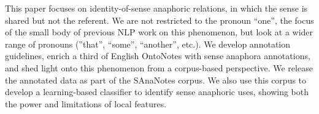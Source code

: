 This paper focuses on identity-of-sense anaphoric relations, in which the sense is shared but not the referent. We are not restricted to the pronoun ``one'', the focus of the small body of previous NLP work on this phenomenon, but look at a wider range of pronouns (''that'', ``some'', ``another'', etc.). We develop annotation guidelines, enrich a third of English OntoNotes with sense anaphora annotations, and shed light onto this phenomenon from a corpus-based perspective. We release the annotated data as part of the SAnaNotes corpus. We also use this corpus to develop a learning-based classifier to identify sense anaphoric uses, showing both the power and limitations of local features.
